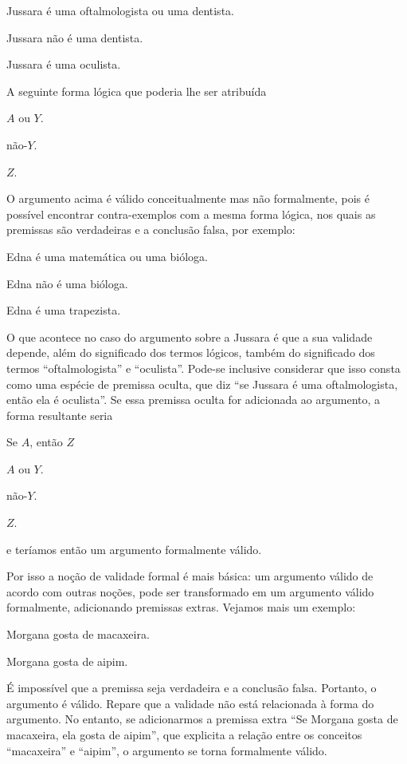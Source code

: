 \begin{earg}
	\item[] Jussara é uma oftalmologista ou uma dentista.
	\item[] Jussara não é uma dentista.
	\item[\therefore] Jussara é uma oculista.
\end{earg}
A seguinte forma lógica que poderia lhe ser atribuída
\begin{earg}
	\item[] $A$  ou  $Y$.
	\item[] não-$Y$.
	\item[\therefore] $Z$.
\end{earg}
O argumento acima é válido conceitualmente mas não formalmente,  pois é possível encontrar contra-exemplos com a mesma forma lógica, nos quais as premissas são verdadeiras e a conclusão falsa, por exemplo: 
\begin{earg}
	\item[] Edna é uma matemática ou uma bióloga.
	\item[] Edna não é uma bióloga.
	\item[\therefore] Edna é uma trapezista.
\end{earg}

O que acontece no caso do argumento sobre a Jussara é que a sua validade depende, além do significado dos termos lógicos, também do significado dos termos ``oftalmologista'' e ``oculista''. 
Pode-se inclusive considerar que isso consta como uma espécie de premissa oculta, que diz ``se Jussara é uma oftalmologista, então ela é oculista''.
Se essa premissa oculta for adicionada ao argumento, a forma resultante seria 
\begin{earg}
	\item[] Se $A$, então $Z$
	\item[] $A$  ou  $Y$.
	\item[] não-$Y$.
	\item[\therefore] $Z$.
\end{earg}
e teríamos então um argumento formalmente válido. 

Por isso a noção de validade formal é mais básica: um argumento válido de acordo com outras noções, pode ser transformado em um argumento válido formalmente, adicionando premissas extras. Vejamos mais um exemplo:
	\begin{earg}
		\item[] Morgana gosta de macaxeira.
		\item[\therefore] Morgana gosta de aipim.
	\end{earg}
É impossível que a premissa seja verdadeira e a conclusão falsa.
Portanto, o argumento é válido.
Repare que a validade não está relacionada à forma do argumento.
No entanto, se adicionarmos a premissa extra ``Se Morgana gosta de macaxeira, ela gosta de aipim'', que explicita a relação entre os conceitos ``macaxeira'' e ``aipim'', o argumento se torna formalmente válido.



